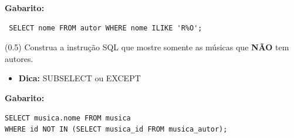\documentclass[12pt]{exam}
\begin{document}
\begin{questions}
\textbf{Gabarito:}
\begin{verbatim}
 SELECT nome FROM autor WHERE nome ILIKE 'R%O';
\end{verbatim}







\question (0.5)  Construa a instrução SQL que mostre somente as músicas que \textbf{NÃO} tem autores.

\begin{itemize}
    \item \textbf{Dica:} SUBSELECT ou EXCEPT
\end{itemize}

\textbf{Gabarito:}
\begin{verbatim}
SELECT musica.nome FROM musica 
WHERE id NOT IN (SELECT musica_id FROM musica_autor);
\end{verbatim}



\end{questions}
\end{document}
